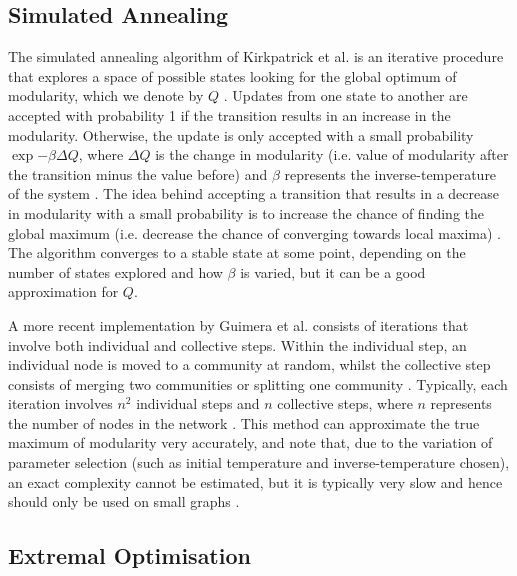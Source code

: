 
\subsection{Simulated Annealing}
\label{subsec:simulatedAnnealing}

The simulated annealing algorithm of Kirkpatrick et al. \cite{KGV83} is an iterative procedure that explores a space of possible states looking for the global optimum of modularity, which we denote by $Q$ \cite{KGV83,For10}.
Updates from one state to another are accepted with probability 1 if the transition results in an increase in the modularity.
Otherwise, the update is only accepted with a small probability $\exp{-\beta \Delta Q}$, where $\Delta Q$ is the change in modularity (i.e. value of modularity after the transition minus the value before) and $\beta$ represents the inverse-temperature of the system \cite{KGV83,For10}.
The idea behind accepting a transition that results in a decrease in modularity with a small probability is to increase the chance of finding the global maximum (i.e. decrease the chance of converging towards local maxima) \cite{For10}.
The algorithm converges to a stable state at some point, depending on the number of states explored and how $\beta$ is varied, but it can be a good approximation for $Q$.

A more recent implementation by Guimera et al. \cite{GSA04} consists of iterations that involve both individual and collective steps.
Within the individual step, an individual node is moved to a community at random, whilst the collective step consists of merging two communities or splitting one community \cite{GSA04}.
Typically, each iteration involves $n^{2}$ individual steps and $n$ collective steps, where $n$ represents the number of nodes in the network \cite{For10}.
This method can approximate the true maximum of modularity very accurately, and note that, due to the variation of parameter selection (such as initial temperature and inverse-temperature chosen), an exact complexity cannot be estimated, but it is typically very slow and hence should only be used on small graphs \cite{For10}.


\subsection{Extremal Optimisation}
\label{subsec:extremalOptimisation}

